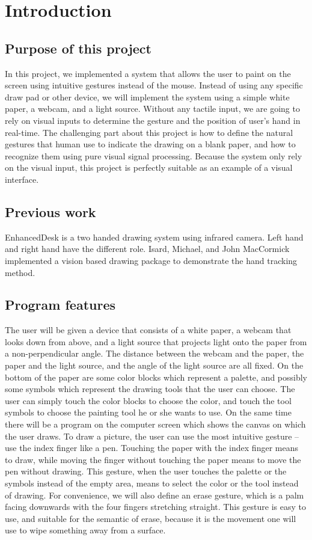 \section{Introduction}
\subsection{Purpose of this project}
    In this project, we implemented a system that allows the user to paint on the screen using intuitive gestures instead of the mouse. 
    Instead of using any specific draw pad or other device, we will implement the system using a simple white paper, a webcam, and a light source. 
    Without any tactile input, we are going to rely on visual inputs to determine the gesture and the position of user's hand in real-time. 
    The challenging part about this project is how to define the natural gestures that human use to indicate the drawing on a  blank paper, and how to recognize them using pure visual signal processing. Because the system only rely on the visual input, this project is perfectly suitable as an example of a visual interface. 
\subsection{Previous work}
    EnhancedDesk\cite{a} is a two handed drawing system using infrared camera. Left hand and right hand have the different role.  Isard, Michael, and John MacCormick implemented a vision based drawing package to demonstrate the hand tracking method\cite{b}.
\subsection{Program features}
The user will be given a device that consists of a white paper, a webcam that looks down from above, 
and a light source that projects light onto the paper from a non-perpendicular angle.
The distance between the webcam and the paper, the paper and the light source, and the angle of the light source are all fixed. On the bottom of the paper are some color blocks which represent a palette, and possibly some symbols which represent the drawing tools that the user can choose. The user can simply touch the color blocks to choose the color, and touch the tool symbols to choose the painting tool he or she wants to use. On the same time there will be a program on the computer screen which shows the canvas on which the user draws. 
To draw a picture, the user can use the most intuitive gesture -- use the index finger like a pen. 
Touching the paper with the index finger means to draw, while moving the finger without touching the paper means to move the pen without drawing. 
This gesture, when the user touches the palette or the symbols instead of the empty area, means to select the color or the tool instead of drawing. 
For convenience, we will also define an erase gesture, which is a palm facing downwards with the four fingers stretching straight. This gesture is easy to use, and suitable for the semantic of erase, because it is the movement one will use to wipe something away from a surface.
